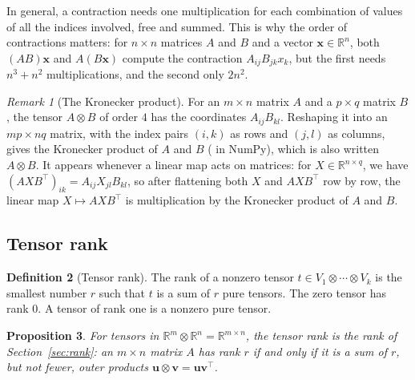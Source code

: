 \documentclass[11pt]{article}
\newcommand{\py}[1]{\texttt{\detokenize{#1}}}
\theoremstyle{definition}
\newtheorem{definition}{Definition}[section]
\theoremstyle{plain}
\newtheorem{proposition}[definition]{Proposition}
\theoremstyle{remark}
\newtheorem{remark}[definition]{Remark}
\begin{document}
In general, a contraction needs one multiplication for each combination of values of all the indices involved, free and summed. This is why the order of contractions matters: for $n \times n$ matrices $A$ and $B$ and a vector $\mathbf{x} \in \mathbb{R}^n$, both $(AB)\mathbf{x}$ and $A(B\mathbf{x})$ compute the contraction $A_{ij}B_{jk}x_k$, but the first needs $n^3 + n^2$ multiplications, and the second only $2n^2$.

\begin{remark}[The Kronecker product]\label{rem:kronecker}
    For an $m \times n$ matrix $A$ and a $p \times q$ matrix $B$, the tensor $A \otimes B$ of order $4$ has the coordinates $A_{ij}B_{kl}$. Reshaping it into an $mp \times nq$ matrix, with the index pairs $(i, k)$ as rows and $(j, l)$ as columns, gives the Kronecker product of $A$ and $B$ (\py{np.kron} in NumPy), which is also written $A \otimes B$. It appears whenever a linear map acts on matrices: for $X \in \mathbb{R}^{n \times q}$, we have $(AXB^\top)_{ik} = A_{ij}X_{jl}B_{kl}$, so after flattening both $X$ and $AXB^\top$ row by row, the linear map $X \mapsto AXB^\top$ is multiplication by the Kronecker product of $A$ and $B$.
\end{remark}

\subsection{Tensor rank}

\begin{definition}[Tensor rank]\label{def:tensor-rank}
    The rank of a nonzero tensor $t \in V_1 \otimes \cdots \otimes V_k$ is the smallest number $r$ such that $t$ is a sum of $r$ pure tensors. The zero tensor has rank $0$. A tensor of rank one is a nonzero pure tensor.
\end{definition}

\begin{proposition}\label{prop:matrix-tensor-rank}
    For tensors in $\mathbb{R}^m \otimes \mathbb{R}^n = \mathbb{R}^{m \times n}$, the tensor rank is the rank of Section~\ref{sec:rank}: an $m \times n$ matrix $A$ has rank $r$ if and only if it is a sum of $r$, but not fewer, outer products $\mathbf{u} \otimes \mathbf{v} = \mathbf{u}\mathbf{v}^\top$.
\end{proposition}
\end{document}
